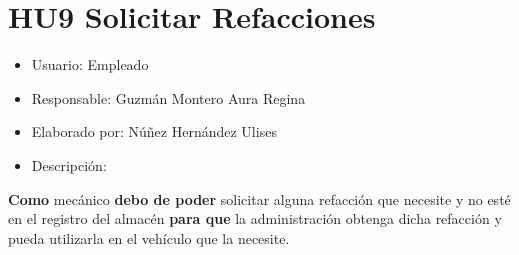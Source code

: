 \section{HU9 Solicitar Refacciones}
\begin{itemize}
	\item Usuario: Empleado
	\item Responsable: Guzmán Montero Aura Regina
	\item Elaborado por: Núñez Hernández Ulises
	\item Descripción:\\
\end{itemize}

\textbf{Como} mecánico \textbf{debo de poder} solicitar alguna refacción que necesite y no esté en el registro del almacén \textbf{para que} la administración obtenga dicha refacción y pueda utilizarla en el vehículo que la necesite. 
